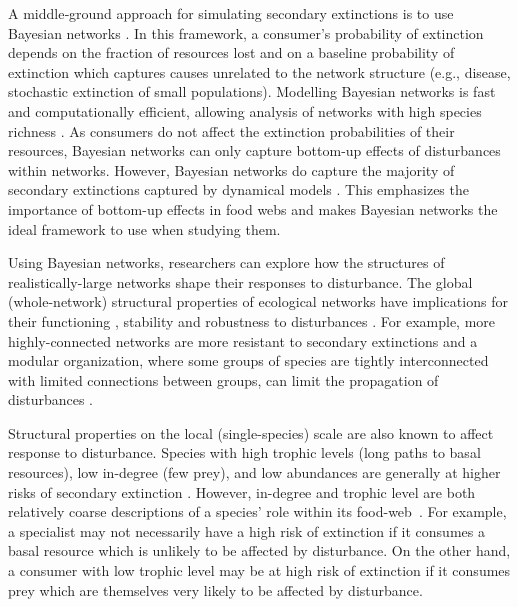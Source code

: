 \documentclass[12pt]{article}
\begin{document}
\begin{spacing}{2.0}
    
    A middle‐ground approach for simulating secondary extinctions is to use Bayesian networks \citep{Eklof2013}. 
    In this framework, a consumer's probability of extinction depends on the fraction of resources lost and on a baseline probability of extinction which captures causes unrelated to the network structure (e.g., disease, stochastic extinction of small populations).
    Modelling Bayesian networks is fast and computationally efficient, allowing analysis of networks with high species richness \citep{Haussler2020}. 
    As consumers do not affect the extinction probabilities of their resources, Bayesian networks can only capture bottom-up effects of disturbances within networks. 
    However, Bayesian networks do capture the majority of secondary extinctions captured by dynamical models \citep{Eklof2013}.
    This emphasizes the importance of bottom-up effects in food webs and makes Bayesian networks the ideal framework to use when studying them.  

    Using Bayesian networks, researchers can explore how the structures of realistically-large networks shape their responses to disturbance.
    The global (whole-network) structural properties of ecological networks have implications for their functioning \citep{Petchey2002}, stability \citep{Allesina2012} and robustness to disturbances \citep{Dunne2002, Eklof2006}. 
    For example, more highly-connected networks are more resistant to secondary extinctions \citep{Dunne2002, Eklof2006} and a modular organization, where some groups of species are tightly interconnected with limited connections between groups, can limit the propagation of disturbances \citep{Krause2003, Teng2004, Gilarranz2017}.
    
    Structural properties on the local (single-species) scale are also known to affect response to disturbance. 
    Species with high trophic levels (long paths to basal resources), low in-degree (few prey), and low abundances are generally at higher risks of secondary extinction \citep{binzer2011susceptibility}. 
    However, in-degree and trophic level are both relatively coarse descriptions of a species' role within its food-web~\citep{Cirtwill2018FoodWebs}. 
    For example, a specialist may not necessarily have a high risk of extinction if it consumes a basal resource which is unlikely to be affected by disturbance. 
    On the other hand, a consumer with low trophic level may be at high risk of extinction if it consumes prey which are themselves very likely to be affected by disturbance. 
    

\end{spacing}
\end{document}
